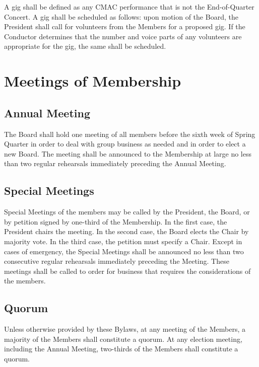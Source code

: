 \documentclass{article}
\begin{document}
A gig shall be defined as any CMAC performance that is not the End-of-Quarter
Concert. A gig shall be scheduled as follows: upon motion of the Board, the
President shall call for volunteers from the Members for a proposed gig. If the
Conductor determines that the number and voice parts of any volunteers are
appropriate for the gig, the same shall be scheduled.

\section{Meetings of Membership} \label{meeting}

\subsection{Annual Meeting} \label{annual_meeting}

The Board shall hold one meeting of all members before the sixth week
of Spring Quarter in order to deal with group business as needed and in order to
elect a new Board. The meeting shall be announced to the Membership at large no
less than two regular rehearsals immediately preceding the Annual
Meeting.

\subsection{Special Meetings}

Special Meetings of the members may be called by the President, the Board, or by
petition signed by one-third of the Membership. In the first case, the President
chairs the meeting. In the second case, the Board elects the Chair by majority
vote. In the third case, the petition must specify a Chair. Except in cases of
emergency, the Special Meetings shall be announced no less than two consecutive
regular rehearsals immediately preceding the Meeting. These meetings shall be
called to order for business that requires the considerations of the members.

\subsection{Quorum}

Unless otherwise provided by these Bylaws, at any meeting of the Members,
a majority of the Members shall constitute a quorum. At any election
meeting, including the Annual Meeting, two-thirds of the Members shall
constitute a quorum.
\end{document}

